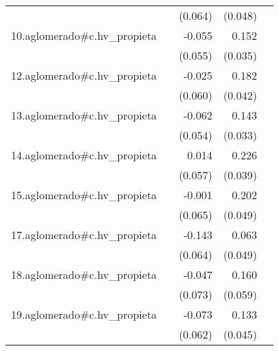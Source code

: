 {\begin{longtable}{l*{4}{D{.}{.}{-1}}}
            &                     &     (0.064)         &     (0.048)         &                     \\
\addlinespace
10.aglomerado#c.hv\_propieta&                     &      -0.055         &       0.152\sym{***}&                     \\
            &                     &     (0.055)         &     (0.035)         &                     \\
\addlinespace
12.aglomerado#c.hv\_propieta&                     &      -0.025         &       0.182\sym{***}&                     \\
            &                     &     (0.060)         &     (0.042)         &                     \\
\addlinespace
13.aglomerado#c.hv\_propieta&                     &      -0.062         &       0.143\sym{***}&                     \\
            &                     &     (0.054)         &     (0.033)         &                     \\
\addlinespace
14.aglomerado#c.hv\_propieta&                     &       0.014         &       0.226\sym{***}&                     \\
            &                     &     (0.057)         &     (0.039)         &                     \\
\addlinespace
15.aglomerado#c.hv\_propieta&                     &      -0.001         &       0.202\sym{***}&                     \\
            &                     &     (0.065)         &     (0.049)         &                     \\
\addlinespace
17.aglomerado#c.hv\_propieta&                     &      -0.143\sym{*}  &       0.063         &                     \\
            &                     &     (0.064)         &     (0.049)         &                     \\
\addlinespace
18.aglomerado#c.hv\_propieta&                     &      -0.047         &       0.160\sym{**} &                     \\
            &                     &     (0.073)         &     (0.059)         &                     \\
\addlinespace
19.aglomerado#c.hv\_propieta&                     &      -0.073         &       0.133\sym{**} &                     \\
            &                     &     (0.062)         &     (0.045)         &                     \\

\end{longtable}}
